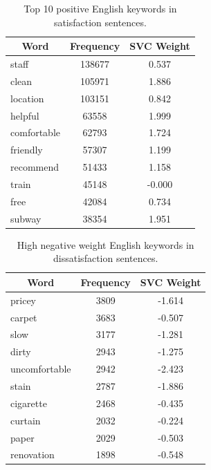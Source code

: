 \documentclass[review]{elsarticle}
\begin{document}
\begin{table}[hbp]
\centering
\caption{Top 10 positive English keywords in satisfaction sentences.}
\label{tab:pos_keys_en}
\begin{tabular}{|l|c|c|}
\hline
\multicolumn{1}{|c|}{\textbf{Word}} & \textbf{Frequency} & \textbf{SVC Weight} \\ \hline
staff & 138677 & 0.537 \\ \hline
clean & 105971 & 1.886 \\ \hline
location & 103151 & 0.842 \\ \hline
helpful & 63558 & 1.999 \\ \hline
comfortable & 62793 & 1.724 \\ \hline
friendly & 57307 & 1.199 \\ \hline
recommend & 51433 & 1.158 \\ \hline
train & 45148 & -0.000 \\ \hline
free & 42084 & 0.734 \\ \hline
subway & 38354 & 1.951 \\ \hline
\end{tabular}
\end{table}


\begin{table}[hbp]
\centering
\caption{High negative weight English keywords in dissatisfaction sentences.}
\label{tab:neg_keys_en}
\begin{tabular}{|l|c|c|}
\hline
\multicolumn{1}{|c|}{\textbf{Word}} & \textbf{Frequency} & \textbf{SVC Weight} \\ \hline
pricey & 3809 & -1.614 \\ \hline
carpet & 3683 & -0.507 \\ \hline
slow & 3177 & -1.281 \\ \hline
dirty & 2943 & -1.275 \\ \hline
uncomfortable & 2942 & -2.423 \\ \hline
stain & 2787 & -1.886 \\ \hline
cigarette & 2468 & -0.435 \\ \hline
curtain & 2032 & -0.224 \\ \hline
paper & 2029 & -0.503 \\ \hline
renovation & 1898 & -0.548 \\ \hline
\end{tabular}
\end{table}
\end{document}
